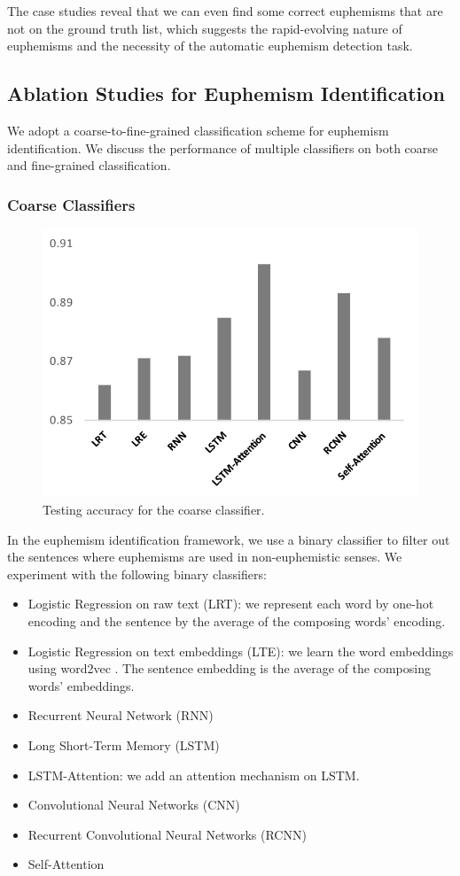 The case studies reveal that we can even find some correct euphemisms that are not on the ground truth list, which suggests the rapid-evolving nature of euphemisms and the necessity of the automatic euphemism detection task. 




\subsection{Ablation Studies for Euphemism Identification}
We adopt a coarse-to-fine-grained classification scheme for euphemism identification. 
We discuss the performance of multiple classifiers on both coarse and fine-grained classification. 

\subsubsection{Coarse Classifiers}
\label{sec:ablation_coarse}
\begin{figure}[ht!]
	\centering
	\includegraphics[width=0.7\linewidth]{figures/11}
	\caption{Testing accuracy for the coarse classifier.}
	\label{fig:11}
\end{figure}

In the euphemism identification framework, we use a binary classifier to filter out the sentences where euphemisms are used in non-euphemistic senses. 
We experiment with the following binary classifiers: 
\begin{itemize}
	\item Logistic Regression on raw text (LRT): we represent each word by one-hot encoding and the sentence by the average of the composing words' encoding. 
	\item Logistic Regression on text embeddings (LTE): we learn the word embeddings using word2vec \cite{mikolov2013distributed,mikolov2013efficient}. The sentence embedding is the average of the composing words' embeddings. 
	\item Recurrent Neural Network (RNN) \cite{rumelhart1985learning}
	\item Long Short-Term Memory (LSTM) \cite{hochreiter1997long}
	\item LSTM-Attention: we add an attention mechanism \cite{bahdanau2015neural} on LSTM. 
	\item Convolutional Neural Networks (CNN) \cite{kim2014convolutional}
	\item Recurrent Convolutional Neural Networks (RCNN) \cite{lai2015recurrent}
	\item Self-Attention \cite{lin2017structured}
\end{itemize}

